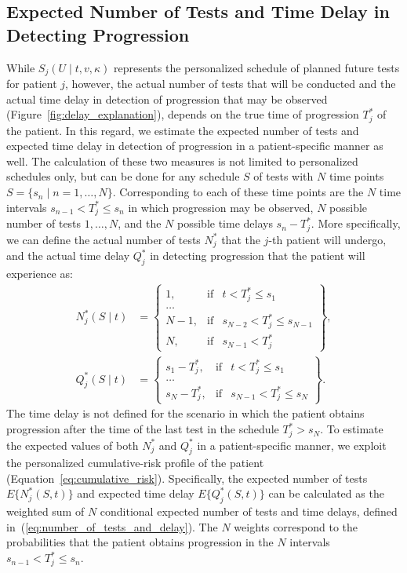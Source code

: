 \subsection{Expected Number of Tests and Time Delay in Detecting Progression}
\label{subsec:exp_delay_estimation}
While $S_j(U \mid t, v, \kappa)$ represents the personalized schedule of planned future tests for patient $j$, however, the actual number of tests that will be conducted and the actual time delay in detection of progression that may be observed (Figure~\ref{fig:delay_explanation}), depends on the true time of progression $T^*_j$ of the patient. In this regard, we estimate the expected number of tests and expected time delay in detection of progression in a patient-specific manner as well. The calculation of these two measures is not limited to personalized schedules only, but can be done for any schedule $S$ of tests with $N$ time points $S=\{s_n \mid n=1,\ldots, N\}$. Corresponding to each of these time points are the $N$ time intervals ${s_{n-1} < T^*_j \leq s_n}$ in which progression may be observed, $N$ possible number of tests $1,\ldots, N$, and the $N$ possible time delays $s_n - T^*_j$. More specifically, we can define the actual number of tests $N^*_j$ that the $j$-th patient will undergo, and the actual time delay $Q^*_j$ in detecting progression that the patient will experience as:
\begin{equation}
\label{eq:number_of_tests_and_delay}
\begin{split}
N^*_j (S \mid t) &= \left\{ \begin{array}{lcr}
  1, &\mbox{if}& t < T^*_j \leq s_1\\
  \ldots \\
  N-1, &\mbox{if}& s_{N-2} < T^*_j \leq s_{N-1}\\
  N, &\mbox{if}& s_{N-1} < T^*_j  
\end{array} \right\},\\
Q^*_j (S \mid t) &= \left\{ \begin{array}{lcrr}
  s_1 - T^*_j, &\mbox{if}& t < T^*_j \leq s_1\\
  \ldots \\
  s_N - T^*_j, &\mbox{if}& s_{N-1} < T^*_j \leq s_N  
\end{array} \right\}.
\end{split}
\end{equation}
The time delay is not defined for the scenario in which the patient obtains progression after the time of the last test in the schedule $T^*_j > s_N$. To estimate the expected values of both $N^*_j$ and $Q^*_j$ in a patient-specific manner, we exploit the personalized cumulative-risk profile of the patient (Equation~\ref{eq:cumulative_risk}). Specifically, the expected number of tests $E\{N^*_j(S, t)\}$ and expected time delay $E\{Q^*_j(S, t)\}$ can be calculated as the weighted sum of $N$ conditional expected number of tests and time delays, defined in~(\ref{eq:number_of_tests_and_delay}). The $N$ weights correspond to the probabilities that the patient obtains progression in the $N$ intervals ${s_{n-1} < T^*_j \leq s_n}$.

